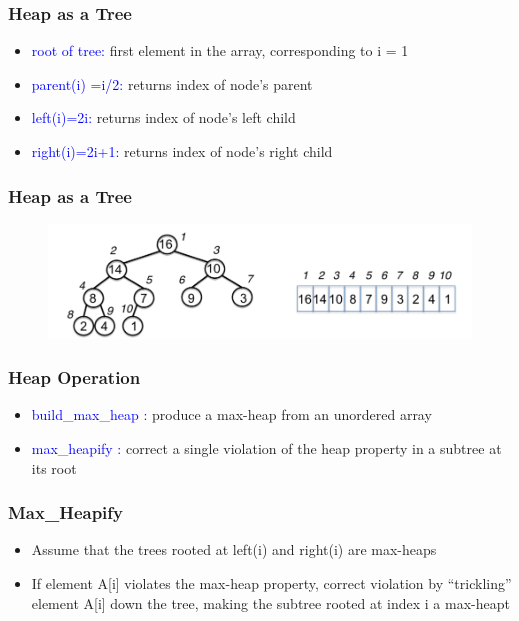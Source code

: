 \documentclass[11pt]{beamer}
\begin{document}
\begin{frame}
	\frametitle	{Heap as a Tree} 
	\begin{itemize}
		\item \textcolor{blue} {root of tree:} first element in the array, corresponding to i = 1 \item \textcolor{blue}{parent(i) =i/2:} returns index of node's parent
		\item \textcolor{blue}{left(i)=2i:} returns index of node's left child
		\item \textcolor{blue}{right(i)=2i+1:} returns index of node's right child
	\end{itemize}
\end{frame}

\begin{frame}
	\frametitle	{Heap as a Tree} 
    \begin{figure}
    	\centering
    	\includegraphics[width=1.09\linewidth]{"Screenshot 2020-12-23 at 8.48.18 PM"}
    	\label{fig:screenshot-2020-12-23-at-8}
    \end{figure}    
\end{frame}

\begin{frame}
	\frametitle	{Heap Operation} 
    \begin{itemize}
    		\item \textcolor{blue}{build\_max\_heap :} produce a max-heap from an unordered array
    	 	\item \textcolor{blue}{max\_heapify :} correct a \alert{single} violation of the heap property in a subtree at its root
    \end{itemize}
\end{frame}

\begin{frame}
	\frametitle	{Max\_Heapify} 
	\begin{itemize}
		\item Assume that the trees rooted at left(i) and right(i) are max-heaps
		\item If element A[i] violates the max-heap property, correct violation by “trickling” element A[i] down the tree, making the subtree rooted at index i a max-heapt
	\end{itemize}
\end{frame}
\end{document}
